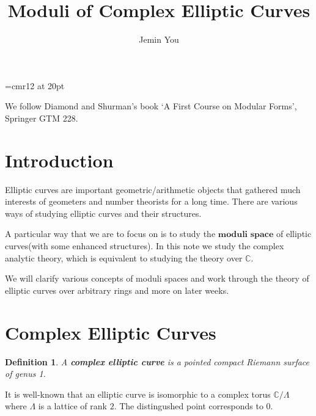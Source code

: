 \documentclass[a4paper,11pt]{article}
\begin{document}
\theoremstyle{plain}
\newtheorem{thm}{Theorem}[section]
\newtheorem{defn}[thm]{Definition}
\newtheorem{exm}[thm]{Example}
\newtheorem{prp}[thm]{Proposition}
\newtheorem{rem}[thm]{Remark}
\newtheorem{lem}[thm]{Lemma}

\font\myfont=cmr12 at 20pt

\title{\vspace{-5ex} \myfont Moduli of Complex Elliptic Curves}
\author{Jemin You}
\date{\vspace{-5ex}}
\maketitle

\setcounter{section}{-1}

We follow Diamond and Shurman's book `A First Course on Modular Forms', Springer GTM 228.

\section{Introduction}

Elliptic curves are important geometric/arithmetic objects that gathered much interests of geometers and number theorists for a long time.
There are various ways of studying elliptic curves and their structures.

A particular way that we are to focus on is to study the $\textbf{moduli space}$ of elliptic curves(with some enhanced structures).
In this note we study the complex analytic theory, which is equivalent to studying the theory over $\mathbb{C}$.

We will clarify various concepts of moduli spaces and work through the theory of elliptic curves over arbitrary rings and more on later weeks.

\section{Complex Elliptic Curves}

\begin{defn}
A \textbf{complex elliptic curve} is a pointed compact Riemann surface of genus 1.
\end{defn}

It is well-known that an elliptic curve is isomorphic to a complex torus $\mathbb{C}/\Lambda$ where $\Lambda$ is a lattice of rank $2$.
The distingushed point corresponds to $0$.
\end{document}
